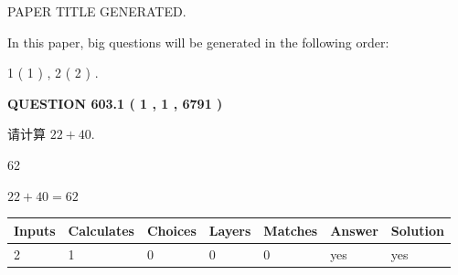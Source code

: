 \documentclass{ctexart}
\begin{document}
   
 \vspace{0.2in}
 
 
 
 
   
   
 PAPER TITLE GENERATED.
   
   
   
\vspace{0.2in}
   
In this paper, big questions will be generated in the following order: 
   
   
   1 ( 1 )
 ,
   2 ( 2 )
 .
  
\vspace{0.2in}
  
{\textbf{\Large{QUESTION
603.1 
 ( 1 , 1 , 6791 )
}}}
  
  
 
请计算 $ %
22 +  %
40 $.
 
 
 
\noindent{}
 
 

62
 
 
\noindent{}
 
 

 
 
 
\noindent{}
 
 

$ %
22 +  %
40=   %
62$
 
 
\noindent{}
 
 

 
   
   
   
   
\noindent\begin{tabular}{|l|l|l|l|l|l|l|}
 \hline
Inputs & Calculates & Choices & Layers & Matches & Answer & Solution \\ \hline
 2  & 
 1  & 
 0
  & 
 0  & 
 0  & 
  yes & 
  yes 
  \\ \hline
 \end{tabular}
   
   
   
   
\noindent{}
   
   
  
\end{document}
